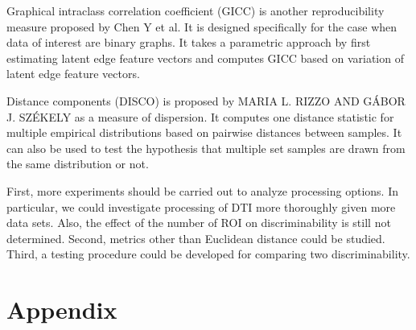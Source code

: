 \documentclass{article}
\begin{document}
Graphical intraclass correlation coefficient (GICC) is another reproducibility measure proposed by Chen Y et al. It is designed specifically for the case when data of interest are binary graphs. It takes a parametric approach by first estimating latent edge feature vectors and computes GICC based on variation of latent edge feature vectors.

Distance components (DISCO) is proposed by MARIA L. RIZZO AND GÁBOR J. SZÉKELY as a measure of dispersion. It computes one distance statistic for multiple empirical distributions based on pairwise distances between samples. It can also be used to test the hypothesis that multiple set samples are drawn from the same distribution or not. 


 First, more experiments should be carried out to analyze processing options. In particular, we could investigate processing of DTI more thoroughly given more data sets. Also, the effect of the number of ROI on discriminability is still not determined. Second, metrics other than Euclidean distance could be studied. Third, a testing procedure could be developed for comparing two discriminability.



\section{Appendix}


% 
% 
% 
% 
% 
% 
% 
% 



\appendix






\newpage
\small{


}
\end{document}
